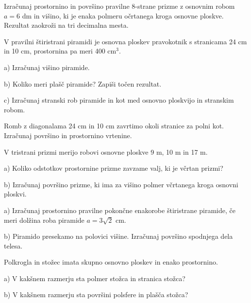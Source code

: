 \documentclass[a4paper,11pt]{letter}
\begin{document}
\begin{naloga}
Izračunaj prostornino in površino pravilne 8-strane prizme z osnovnim robom $a=6$ dm in višino,
ki je enaka polmeru očrtanega kroga osnovne ploskve. Rezultat zaokroži na tri decimalna mesta.
\end{naloga}

\begin{naloga}
V pravilni štiristrani piramidi je osnovna ploskev pravokotnik s stranicama 24 cm in 10 cm,
prostornina pa meri 400 cm$^3$.

a) Izračunaj višino piramide.

b) Koliko meri plašč piramide? Zapiši točen rezultat.

c) Izračunaj stranski rob piramide in kot med osnovno ploskvijo in stranskim robom.
\end{naloga}

\begin{naloga}
Romb z diagonalama 24 cm in 10 cm zavrtimo okoli stranice za polni kot.
Izračunaj površino in prostornino vrtenine.
\end{naloga}


\begin{naloga}
V tristrani prizmi merijo robovi osnovne ploskve 9 m, 10 m in 17 m.

a) Koliko odstotkov prostornine prizme zavzame valj, ki je včrtan prizmi?

b) Izračunaj površino prizme, ki ima za višino polmer včrtanega kroga osnovni ploskvi.
\end{naloga}
\newpage

\begin{naloga}
a) Izračunaj prostornino pravilne pokončne enakorobe štiristrane piramide,
če meri dolžina roba piramide $a=3\sqrt{2}$ cm.

b) Piramido presekamo na polovici višine. Izračunaj površino spodnjega dela telesa.
\end{naloga}

\begin{naloga}
Polkrogla in stožec imata skupno osnovno ploskev in enako prostornino.

a) V kakšnem razmerju sta polmer stožca in stranica stožca?

b) V kakšnem razmerju sta površini polsfere in plašča stožca?
\end{naloga}
\end{document}
